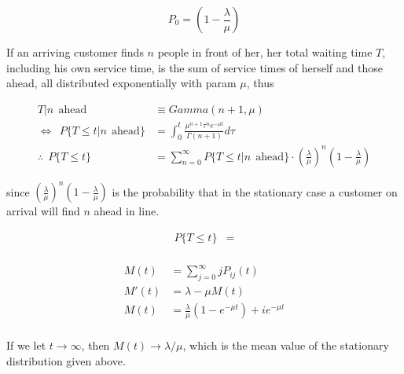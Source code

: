 \documentclass[12pt]{article}
\theoremstyle{nonumberbreak}
\begin{document}
$$
P_0 = (1 - \frac{\lambda}{\mu})
$$


If an arriving customer finds $n$ people in front of her, her total waiting time $T$, including his own service time, is the sum of service times of herself and those ahead, all distributed exponentially with param $\mu$, thus 

$$
\begin{aligned}
T | n \ \ \mathrm{ahead} &\equiv Gamma(n+1, \mu) \\[8pt]
\Leftrightarrow \ \ P \{ T \le t | n \ \ \mathrm{ahead}  \} &= \int_0^t \frac{\mu^{n+1} \tau^n e^{-\mu t} }{\Gamma(n+1)} d\tau \\[10pt]
\therefore \ \ P \{ T \le t\} &= \sum_{n=0}^\infty P \{ T \le t | n \ \ \mathrm{ahead} \} \cdot (\frac{\lambda}{\mu})^n (1 - \frac{\lambda}{\mu})
\end{aligned}
$$  

since $(\frac{\lambda}{\mu})^n (1 - \frac{\lambda}{\mu})$ is the probability that in the stationary case a customer on arrival will find $n$ ahead in line. 


$$
\begin{aligned}
P \{ T \le t\} &= \\[8pt]
\end{aligned}
$$



$$
\begin{aligned}
M(t) &= \sum_{j=0}^\infty j P_{ij}(t) \\[8pt]
M'(t) &= \lambda - \mu M(t) \\[8pt]
M(t) &= \frac{\lambda}{\mu} (1 - e^{-\mu t}) + i e^{-\mu t} \\[8pt]
\end{aligned}
$$

If we let $t \to \infty$, then $M(t) \to \lambda/\mu$, which is the mean value of the stationary distribution given above. 
\end{document}
